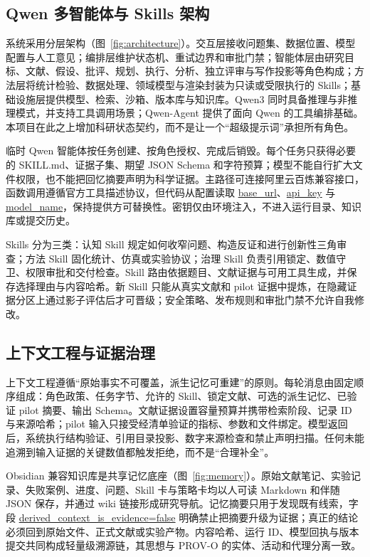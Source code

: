 \documentclass[12pt]{article}
\begin{document}
\subsection*{Qwen 多智能体与 Skills 架构}

系统采用分层架构（图~\ref{fig:architecture}）。交互层接收问题集、数据位置、模型配置与人工意见；编排层维护状态机、重试边界和审批门禁；智能体层由研究目标、文献、假设、批评、规划、执行、分析、独立评审与写作投影等角色构成；方法层将统计检验、数据处理、领域模型与渲染封装为只读或受限执行的 Skills；基础设施层提供模型、检索、沙箱、版本库与知识库。Qwen3 同时具备推理与非推理模式，并支持工具调用场景\cite{qwen3}；Qwen-Agent 提供了面向 Qwen 的工具编排基础\cite{qwenagent}。本项目在此之上增加科研状态契约，而不是让一个“超级提示词”承担所有角色。

临时 Qwen 智能体按任务创建、按角色授权、完成后销毁。每个任务只获得必要的 SKILL.md、证据子集、期望 JSON Schema 和字符预算；模型不能自行扩大文件权限，也不能把回忆摘要声明为科学证据。主路径可连接阿里云百炼兼容接口，函数调用遵循官方工具描述协议\cite{bailian}，但代码从配置读取 \url{base_url}、\url{api_key} 与 \url{model_name}，保持提供方可替换性。密钥仅由环境注入，不进入运行目录、知识库或提交历史。

Skills 分为三类：认知 Skill 规定如何收窄问题、构造反证和进行创新性三角审查；方法 Skill 固化统计、仿真或实验协议；治理 Skill 负责引用锁定、数值守卫、权限审批和交付检查。Skill 路由依据题目、文献证据与可用工具生成，并保存选择理由与内容哈希。新 Skill 只能从真实文献和 pilot 证据中提炼，在隐藏证据分区上通过影子评估后才可晋级；安全策略、发布规则和审批门禁不允许自我修改。

\subsection*{上下文工程与证据治理}

上下文工程遵循“原始事实不可覆盖，派生记忆可重建”的原则。每轮消息由固定顺序组成：角色政策、任务字节、允许的 Skill、锁定文献、可选的派生记忆、已验证 pilot 摘要、输出 Schema。文献证据设置容量预算并携带检索阶段、记录 ID 与来源哈希；pilot 输入只接受经清单验证的指标、参数和文件绑定。模型返回后，系统执行结构验证、引用目录投影、数字来源检查和禁止声明扫描。任何未能追溯到输入证据的关键数值都触发拒绝，而不是“合理补全”。

Obsidian 兼容知识库是共享记忆底座（图~\ref{fig:memory}）。原始文献笔记、实验记录、失败案例、进度、问题、Skill 卡与策略卡均以人可读 Markdown 和伴随 JSON 保存，并通过 wiki 链接形成研究导航。记忆摘要只用于发现既有线索，字段 \url{derived_context_is_evidence=false} 明确禁止把摘要升级为证据；真正的结论必须回到原始文件、正式文献或实验产物。内容哈希、运行 ID、模型回执与版本提交共同构成轻量级溯源链，其思想与 PROV-O 的实体、活动和代理分离一致\cite{provo}。
\end{document}
